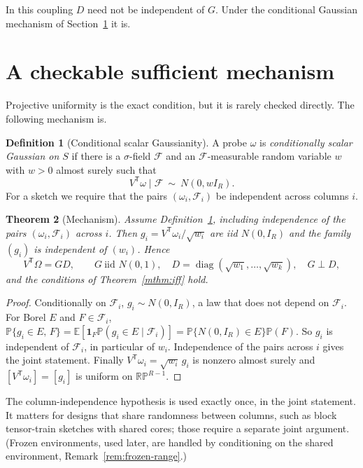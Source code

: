\documentclass[11pt,a4paper]{article}
\newtheorem{theorem}{Theorem}[section]
\theoremstyle{definition}
\newtheorem{definition}[theorem]{Definition}
\theoremstyle{remark}
\numberwithin{equation}{section}
\newcommand{\E}{\mathbb E}
\newcommand{\Prob}{\mathbb P}
\newcommand{\T}{{\mathsf T}}
\newcommand{\diag}{\operatorname{diag}}
\newcommand{\RP}{\mathbb{RP}}
\begin{document}
In this coupling $D$ need not be independent of $G$. Under the conditional
Gaussian mechanism of Section~\ref{sec:mechanism} it is.
\section{A checkable sufficient mechanism}\label{sec:mechanism}

Projective uniformity is the exact condition, but it is rarely checked
directly. The following mechanism is.

\begin{definition}[Conditional scalar Gaussianity]\label{def:csg}
A probe $\omega$ is \emph{conditionally scalar Gaussian on $S$} if there is a
$\sigma$-field $\mathcal F$ and an $\mathcal F$-measurable random variable $w$
with $w>0$ almost surely such that
\begin{equation}\label{eq:criterion}
 V^\T\omega\mid\mathcal F\ \sim\ N(0,wI_R).
\end{equation}
For a sketch we require that the pairs $(\omega_i,\mathcal F_i)$ be
independent across columns $i$.
\end{definition}

\begin{theorem}[Mechanism]\label{thm:mechanism}
Assume Definition~\ref{def:csg}, including independence of the pairs
$(\omega_i,\mathcal F_i)$ across $i$. Then $g_i=V^\T\omega_i/\sqrt{w_i}$ are iid
$N(0,I_R)$ and the family $(g_i)$ is independent of $(w_i)$. Hence
\begin{equation}\label{eq:GD}
 V^\T\Omega=GD,\qquad G\ \text{iid }N(0,1),\quad
 D=\diag(\sqrt{w_1},\ldots,\sqrt{w_k}),\quad G\perp D,
\end{equation}
and the conditions of Theorem~\ref{mthm:iff} hold.
\end{theorem}

\begin{proof}
Conditionally on $\mathcal F_i$, $g_i\sim N(0,I_R)$, a law that does not
depend on $\mathcal F_i$. For Borel $E$ and $F\in\mathcal F_i$,
$\Prob\{g_i\in E,\,F\}=\E[\mathbf 1_F\Prob(g_i\in E\mid\mathcal F_i)]
=\Prob\{N(0,I_R)\in E\}\Prob(F)$. So $g_i$ is independent of $\mathcal F_i$,
in particular of $w_i$. Independence of the pairs across $i$ gives the joint
statement. Finally $V^\T\omega_i=\sqrt{w_i}\,g_i$ is nonzero almost surely and
$[V^\T\omega_i]=[g_i]$ is uniform on $\RP^{R-1}$.
\end{proof}

The column-independence hypothesis is used exactly once, in the joint
statement. It matters for designs that share randomness between columns,
such as block tensor-train sketches with shared cores; those require a
separate joint argument. (Frozen environments, used later, are handled by
conditioning on the shared environment, Remark~\ref{rem:frozen-range}.)
\end{document}
